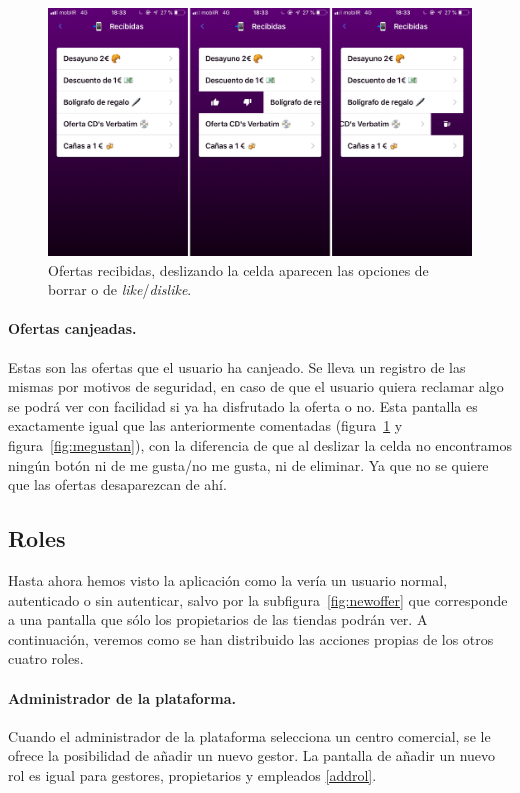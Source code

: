 \begin{figure}[tbp]
\centering
\includegraphics[scale=0.2]{figures/recibidas.png}
\caption{Ofertas recibidas, deslizando la celda aparecen las opciones de borrar o de \textit{like}/\textit{dislike}.\label{fig:recibidas}}
\end{figure}

\paragraph{Ofertas canjeadas.} Estas son las ofertas que el usuario ha canjeado. Se lleva un registro de las mismas por motivos de seguridad, en caso de que el usuario quiera reclamar algo se podrá ver con facilidad si ya ha disfrutado la oferta o no. Esta pantalla es exactamente igual que las anteriormente comentadas (figura~\ref{fig:recibidas} y figura~\ref{fig:megustan}), con la diferencia de que al deslizar la celda no encontramos ningún botón ni de me gusta/no me gusta, ni de eliminar. Ya que no se quiere que las ofertas desaparezcan de ahí.

\subsection{Roles}
Hasta ahora hemos visto la aplicación como la vería un usuario normal, autenticado o sin autenticar, salvo por la subfigura~\ref{fig:newoffer} que corresponde a una pantalla que sólo los propietarios de las tiendas podrán ver. A continuación, veremos como se han distribuido las acciones propias de los otros cuatro roles.

\paragraph{Administrador de la plataforma.} Cuando el administrador de la plataforma selecciona un centro comercial, se le ofrece la posibilidad de añadir un nuevo gestor. La pantalla de añadir un nuevo rol es igual para gestores, propietarios y empleados \ref{addrol}.

